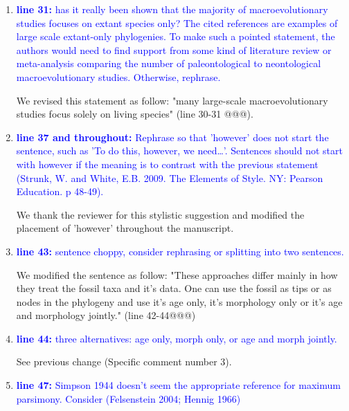 \documentclass[12pt,letterpaper]{article}
\begin{document}
\begin{enumerate}

\item{\textcolor{blue}{\textbf{line 31:} has it really been shown that the majority of macroevolutionary studies focuses on extant species only? The cited references are examples of large scale extant-only phylogenies. To make such a pointed statement, the authors would need to find support from some kind of literature review or meta-analysis comparing the number of paleontological to neontological macroevolutionary studies. Otherwise, rephrase. }}

We revised this statement as follow: "many large-scale macroevolutionary studies focus solely on living species" (line 30-31 @@@).

\item{\textcolor{blue}{\textbf{line 37 and throughout:} Rephrase so that 'however' does not start the sentence, such as 'To do this, however, we need…'. Sentences should not start with however if the meaning is to contrast with the previous statement (Strunk, W. and White, E.B. 2009. The Elements of Style. NY: Pearson Education. p 48-49).}}

We thank the reviewer for this stylistic suggestion and modified the placement of 'however' throughout the manuscript.

\item{\textcolor{blue}{\textbf{line 43:} sentence choppy, consider rephrasing or splitting into two sentences.}}

We modified the sentence as follow: "These approaches differ mainly in how they treat the fossil taxa and it's data. One can use the fossil as tips or as nodes in the phylogeny and use it's age only, it's morphology only or it's age and morphology jointly." (line 42-44@@@)

\item{\textcolor{blue}{\textbf{line 44:} three alternatives: age only, morph only, or age and morph jointly. }}

See previous change (Specific comment number 3).

\item{\textcolor{blue}{\textbf{line 47:} Simpson 1944 doesn't seem the appropriate reference for maximum parsimony. Consider (Felsenstein 2004; Hennig 1966) }}


\end{enumerate}
\end{document}
